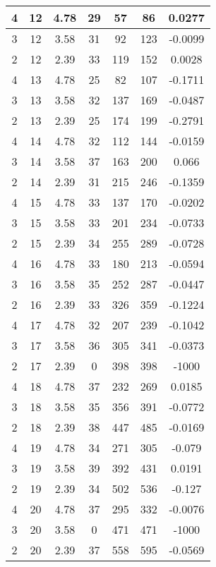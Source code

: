 \documentclass[letterpaper, 12pt]{article}
\begin{document}
\begin{longtable}{|c|c|c|c|c|c|c|}
\hline
4 & 12 & 4.78 & 29 & 57 & 86 & 0.0277 \\
\hline
3 & 12 & 3.58 & 31 & 92 & 123 & -0.0099 \\
\hline
2 & 12 & 2.39 & 33 & 119 & 152 & 0.0028 \\
\hline
4 & 13 & 4.78 & 25 & 82 & 107 & -0.1711 \\
\hline
3 & 13 & 3.58 & 32 & 137 & 169 & -0.0487 \\
\hline
2 & 13 & 2.39 & 25 & 174 & 199 & -0.2791 \\
\hline
4 & 14 & 4.78 & 32 & 112 & 144 & -0.0159 \\
\hline
3 & 14 & 3.58 & 37 & 163 & 200 & 0.066 \\
\hline
2 & 14 & 2.39 & 31 & 215 & 246 & -0.1359 \\
\hline
4 & 15 & 4.78 & 33 & 137 & 170 & -0.0202 \\
\hline
3 & 15 & 3.58 & 33 & 201 & 234 & -0.0733 \\
\hline
2 & 15 & 2.39 & 34 & 255 & 289 & -0.0728 \\
\hline
4 & 16 & 4.78 & 33 & 180 & 213 & -0.0594 \\
\hline
3 & 16 & 3.58 & 35 & 252 & 287 & -0.0447 \\
\hline
2 & 16 & 2.39 & 33 & 326 & 359 & -0.1224 \\
\hline
4 & 17 & 4.78 & 32 & 207 & 239 & -0.1042 \\
\hline
3 & 17 & 3.58 & 36 & 305 & 341 & -0.0373 \\
\hline
2 & 17 & 2.39 & 0 & 398 & 398 & -1000 \\
\hline
4 & 18 & 4.78 & 37 & 232 & 269 & 0.0185 \\
\hline
3 & 18 & 3.58 & 35 & 356 & 391 & -0.0772 \\
\hline
2 & 18 & 2.39 & 38 & 447 & 485 & -0.0169 \\
\hline
4 & 19 & 4.78 & 34 & 271 & 305 & -0.079 \\
\hline
3 & 19 & 3.58 & 39 & 392 & 431 & 0.0191 \\
\hline
2 & 19 & 2.39 & 34 & 502 & 536 & -0.127 \\
\hline
4 & 20 & 4.78 & 37 & 295 & 332 & -0.0076 \\
\hline
3 & 20 & 3.58 & 0 & 471 & 471 & -1000 \\
\hline
2 & 20 & 2.39 & 37 & 558 & 595 & -0.0569 \\
\hline
\end{longtable}
\end{document}
